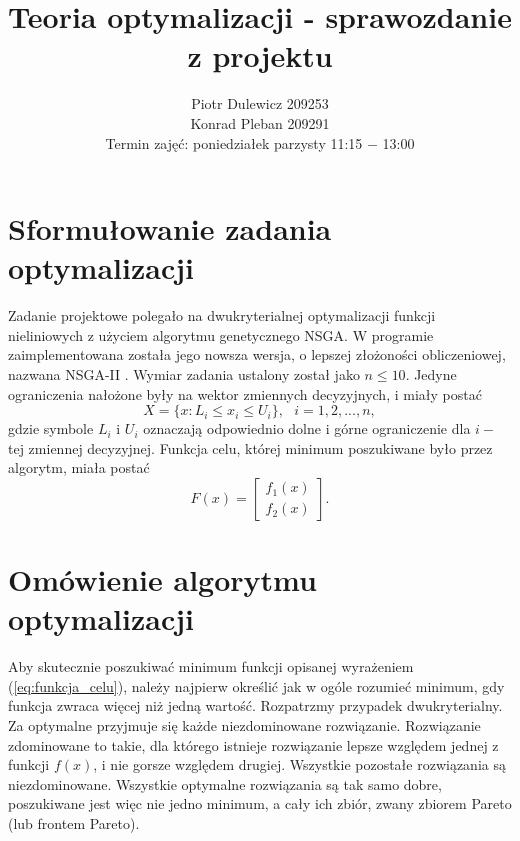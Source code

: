 \documentclass[11pt,a4paper]{article}
\title{Teoria optymalizacji - sprawozdanie z projektu}
\author{Piotr Dulewicz 209253 \\ Konrad Pleban 209291\\ Termin zajęć: poniedziałek parzysty 11:15 \(-\) 13:00}
\date{}
\begin{document}
\maketitle
\section{Sformułowanie zadania optymalizacji}
Zadanie projektowe polegało na dwukryterialnej optymalizacji funkcji nieliniowych z użyciem algorytmu genetycznego NSGA. W programie zaimplementowana została jego nowsza wersja, o lepszej złożoności obliczeniowej, nazwana NSGA-II \cite{deb}. Wymiar zadania ustalony został jako \(n \leqslant 10\). Jedyne ograniczenia nałożone były na wektor zmiennych decyzyjnych, i miały postać
\[
X =  \lbrace x : L_i \leqslant x_i \leqslant U_i \rbrace, ~~~ i = 1,2,... ,n,  
\]
gdzie symbole \(L_i\) i \(U_i\) oznaczają odpowiednio dolne i górne ograniczenie dla \(i-\)tej zmiennej decyzyjnej. Funkcja celu, której minimum poszukiwane było przez algorytm, miała postać
\begin{equation}
F(x) = \begin{bmatrix}
  f_1(x) \\
  f_2(x) 
 \end{bmatrix}.
\label{eq:funkcja_celu}
\end{equation}

\section{Omówienie algorytmu optymalizacji}
Aby skutecznie poszukiwać minimum funkcji opisanej wyrażeniem (\ref{eq:funkcja_celu}), należy najpierw określić jak w ogóle rozumieć minimum, gdy funkcja zwraca więcej niż jedną wartość. Rozpatrzmy przypadek dwukryterialny. Za optymalne przyjmuje się każde niezdominowane rozwiązanie. 
 Rozwiązanie zdominowane to takie, dla którego istnieje rozwiązanie lepsze względem jednej z funkcji \(f(x)\), i nie gorsze względem drugiej. Wszystkie pozostałe rozwiązania są niezdominowane. 
Wszystkie optymalne rozwiązania są tak samo dobre, poszukiwane jest więc nie jedno minimum, a cały ich zbiór, zwany zbiorem Pareto (lub frontem Pareto).
\end{document}
